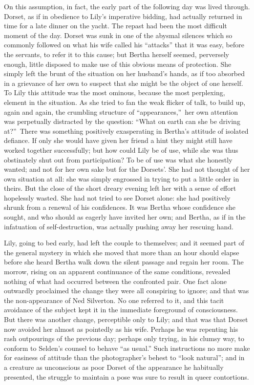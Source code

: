 \documentclass[12pt,a4paper]{book}
\begin{document}
On this assumption, in fact, the early part of the following day
was lived through. Dorset, as if in obedience to Lily's
imperative bidding, had actually returned in time for a late
dinner on the yacht. The repast had been the most difficult
moment of the day. Dorset was sunk in one of the abysmal silences
which so commonly followed on what his wife called his ``attacks''
that it was easy, before the servants, to refer it to this cause;
but Bertha herself seemed, perversely enough, little disposed to
make use of this obvious means of protection. She simply left the
brunt of the situation on her husband's hands, as if too absorbed
in a grievance of her own to suspect that she might be the object
of one herself. To Lily this attitude was the most ominous,
because the most perplexing, element in the situation. As she
tried to fan the weak flicker of talk, to build up, again and
again, the crumbling structure of ``appearances,''\ her own
attention was perpetually distracted by the question: ``What on
earth can she be driving at?''\ There was something positively
exasperating in Bertha's attitude of isolated defiance. If only
she would have given her friend a hint they might still have
worked together successfully; but how could Lily be of use, while
she was thus obstinately shut out from participation? To be of
use was what she honestly wanted; and not for her own sake but
for the Dorsets'. She had not thought of her own situation at
all: she was simply engrossed in trying to put a little order in
theirs. But the close of the short dreary evening left her with a
sense of effort hopelessly wasted. She had not tried to see
Dorset alone: she had positively shrunk from a renewal of his
confidences. It was Bertha whose confidence she sought, and who
should as eagerly have invited her own; and Bertha, as if in the
infatuation of self-destruction, was actually pushing away her
rescuing hand.





Lily, going to bed early, had left the couple to themselves; and
it seemed part of the general mystery in which she moved that
more than an hour should elapse before she heard Bertha walk down
the silent passage and regain her room. The morrow, rising on an
apparent continuance of the same conditions, revealed nothing of
what had occurred between the confronted pair. One fact alone
outwardly proclaimed the change they were all conspiring to
ignore; and that was the non-appearance of Ned Silverton. No one
referred to it, and this tacit avoidance of the subject kept it
in the immediate foreground of consciousness. But there was
another change, perceptible only to Lily; and that was that
Dorset now avoided her almost as pointedly as his wife. Perhaps
he was repenting his rash outpourings of the previous day;
perhaps only trying, in his clumsy way, to conform to Selden's
counsel to behave ``as usual.'' Such instructions no more make for
easiness of attitude than the photographer's behest to ``look
natural''; and in a creature as unconscious as poor Dorset of the
appearance he habitually presented, the struggle to maintain a
pose was sure to result in queer contortions.
\end{document}
